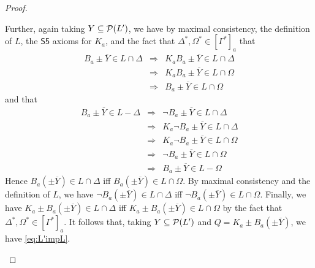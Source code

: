 \documentclass[12pt]{article}
\theoremstyle{definition}
\newcommand{\pow}{{\cal P}}    %
\begin{document}
\begin{proof}
\begin{itemize}
    Further, again taking $Y\subseteq\pow(L')$, we have by maximal
    consistency, the definition of $L$, the $\mathsf{S5}$ axioms for
    $K_a$, and the fact that $\Delta^*,\Omega^*\in[\Gamma^*]_a$ that
    \begin{eqnarray*}
      B_a{\pm}\overline Y\in L\cap\Delta
      & \Rightarrow &
      K_aB_a{\pm}\overline Y\in L\cap\Delta
      \\
      & \Rightarrow &
      K_aB_a{\pm}\overline Y\in L\cap\Omega
      \\
      & \Rightarrow &
      B_a{\pm}\overline Y\in L\cap\Omega
    \end{eqnarray*}
    and that
    \begin{eqnarray*}
      B_a{\pm}\overline Y\in L-\Delta
      & \Rightarrow &
      \lnot B_a{\pm}\overline Y\in L\cap\Delta
      \\
      & \Rightarrow &
      K_a\lnot B_a{\pm}\overline Y\in L\cap\Delta
      \\
      & \Rightarrow &
      K_a\lnot B_a{\pm}\overline Y\in L\cap\Omega
      \\
      & \Rightarrow &
      \lnot B_a{\pm}\overline Y\in L\cap\Omega
      \\
      & \Rightarrow &
      B_a{\pm}\overline Y\in L-\Omega
    \end{eqnarray*}
    Hence $B_a({\pm}\overline Y)\in L\cap\Delta$ iff
    $B_a({\pm}\overline Y)\in L\cap\Omega$.  By maximal consistency
    and the definition of $L$, we have $\lnot B_a({\pm}\overline Y)\in
    L\cap\Delta$ iff $\lnot B_a({\pm}\overline Y)\in L\cap\Omega$.
    Finally, we have $K_a{\pm} B_a({\pm}\overline Y)\in L\cap\Delta$
    iff $K_a{\pm} B_a({\pm}\overline Y)\in L\cap\Omega$ by the fact
    that $\Delta^*,\Omega^*\in[\Gamma^*]_a$.  It follows that, taking
    $Y\subseteq\pow(L')$ and $Q=K_a{\pm} B_a({\pm}\overline Y)$, we
    have \eqref{eq:L'impL}.  


\end{itemize}
\end{proof}
\end{document}
